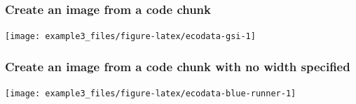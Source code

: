 \documentclass[
]{article}
\begin{document}
\subsubsection{Create an image from a code
chunk}\label{create-an-image-from-a-code-chunk}

\texttt{[image: example3\_files/figure-latex/ecodata-gsi-1]}

\subsubsection{Create an image from a code chunk with no width
specified}\label{create-an-image-from-a-code-chunk-with-no-width-specified}

\texttt{[image: example3\_files/figure-latex/ecodata-blue-runner-1]}
\end{document}
